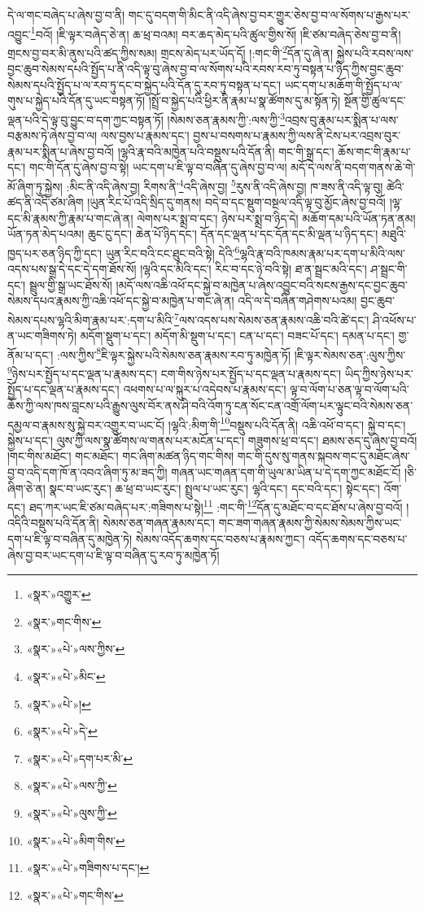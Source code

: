 དེ་ལ་གང་བཞེད་པ་ཞེས་བྱ་བ་ནི། གང་དུ་བདག་གི་མིང་ནི་འདི་ཞེས་བྱ་བར་གྱུར་ཅེས་བྱ་བ་ལ་སོགས་པ་རྒྱས་པར་འབྱུང་\footnote{«སྣར་»འགྱུར་}བའོ། །ཇི་ལྟར་བཞེད་ཅེ་ན། ཆ་ཕྲ་བའམ། བར་ཆད་མེད་པའི་ཚུལ་གྱིས་སོ། །ཇི་ཙམ་བཞེད་ཅེས་བྱ་བ་ནི། གྲངས་བྱ་བར་མི་ནུས་པའི་ཚད་ཀྱིས་སམ། གྲངས་མེད་པར་ཡོད་དོ། །:གང་གི་\footnote{«སྣར་»གང་གིས་}དོན་དུ་ཞེ་ན། སྐྱེས་པའི་རབས་ལས་བྱང་ཆུབ་སེམས་དཔའི་སྤྱོད་པ་ནི་འདི་ལྟ་བུ་ཞེས་བྱ་བ་ལ་སོགས་པའི་རབས་རབ་ཏུ་བསྟན་པ་ཉིད་ཀྱིས་བྱང་ཆུབ་སེམས་དཔའི་སྤྱོད་པ་ལ་རབ་ཏུ་དང་བ་སྐྱེད་པའི་དོན་དུ་རབ་ཏུ་བསྟན་པ་དང་། ཡང་དག་པ་མཆོག་གི་སྤྱོད་པ་ལ་གུས་པ་སྐྱེད་པའི་དོན་དུ་ཡང་བསྟན་ཏོ། །སྤྲོ་བ་སྐྱེད་པའི་ཕྱིར་ནི་རྣམ་པ་སྣ་ཚོགས་དུ་མ་སྟོན་ཏེ། སྔོན་གྱི་ཚུལ་དང་ལྡན་པའི་དེ་ལྟ་བུ་བྱུང་བ་དག་ཀྱང་བསྟན་ཏོ། །སེམས་ཅན་རྣམས་ཀྱི་:ལས་ཀྱི་\footnote{«སྣར་»«པེ་»ལས་ཀྱིས་}འབྲས་བུ་རྣམ་པར་སྨིན་པ་ལས་བརྩམས་ཏེ་ཞེས་བྱ་བ་ལ། ལས་བྱས་པ་རྣམས་དང་། བྱས་པ་བསགས་པ་རྣམས་ཀྱི་ལས་ནི་ངེས་པར་འབྲས་བུར་རྣམ་པར་སྨིན་པ་ཞེས་བྱ་བའོ། །ལྷའི་རྣ་བའི་མཁྱེན་པའི་བསྡུས་པའི་དོན་ནི། གང་གི་སྒྲ་དང་། ཆོས་གང་གི་རྣམ་པ་དང་། གང་གི་དོན་དུ་ཞེས་བྱ་བ་སྟེ། ཡང་དག་པ་ཇི་ལྟ་བ་བཞིན་དུ་ཞེས་བྱ་བ་ལ། མདོ་དེ་ལས་ནི་བདག་གནས་ཆེ་གེ་མོ་ཞིག་ཏུ་སྐྱེས། :མིང་ནི་འདི་ཞེས་བྱ། རིགས་ནི་\footnote{«སྣར་»«པེ་»མིང་}འདི་ཞེས་བྱ། \footnote{«སྣར་»«པེ་»།  }རུས་ནི་འདི་ཞེས་བྱ། ཁ་ཟས་ནི་འདི་ལྟ་བུ། ཚེའི་ཚད་ནི་འདི་ཙམ་ཞིག །ཡུན་རིང་པོ་འདི་སྲིད་དུ་གནས། བདེ་བ་དང་སྡུག་བསྔལ་འདི་ལྟ་བུ་མྱོང་ཞེས་བྱ་བའོ། །ལྷ་དང་མི་རྣམས་ཀྱི་རྣམ་པ་གང་ཞེ་ན། ལེགས་པར་སྨྲ་བ་དང་། ཉེས་པར་སྨྲ་བ་ཉིད་དེ། མཆོག་དམ་པའི་ཡོན་ཏན་ནམ། ཡོན་ཏན་མེད་པའམ། ཆུང་ངུ་དང་། ཆེན་པོ་ཉིད་དང་། དོན་དང་ལྡན་པ་དང་དོན་དང་མི་ལྡན་པ་ཉིད་དང་། མཐུའི་ཁྱད་པར་ཅན་ཉིད་ཀྱི་དང་། ཡུན་རིང་བའི་ངང་ཐུང་བའི་སྟེ། དེའི་\footnote{«སྣར་»«པེ་»དེ་}ལྷའི་རྣ་བའི་ཁམས་རྣམ་པར་དག་པ་མིའི་ལས་འདས་པས་སྒྲ་དེ་དང་དེ་དག་ཐོས་སོ། །ལྷའི་དང་མིའི་དང་། རིང་བ་དང་ཉེ་བའི་སྟེ། ཐ་ན་སྦྲང་མའི་དང་། ཤ་སྦྲང་གི་དང་། སྦྲུལ་གྱི་སྒྲ་ཡང་ཐོས་སོ། །མདོ་ལས་འཆི་འཕོ་དང་སྐྱེ་བ་མཁྱེན་པ་ཞེས་འབྱུང་བའི་སངས་རྒྱས་དང་བྱང་ཆུབ་སེམས་དཔའ་རྣམས་ཀྱི་འཆི་འཕོ་དང་སྐྱེ་བ་མཁྱེན་པ་གང་ཞེ་ན། འདི་ལ་དེ་བཞིན་གཤེགས་པའམ། བྱང་ཆུབ་སེམས་དཔས་ལྷའི་མིག་རྣམ་པར་:དག་པ་མིའི་\footnote{«སྣར་»«པེ་»དག་པར་མི་}ལས་འདས་པས་སེམས་ཅན་རྣམས་འཆི་བའི་ཚེ་དང་། ཤི་འཕོས་པ་ན་ཡང་གཟིགས་ཏེ། མདོག་སྡུག་པ་དང་། མདོག་མི་སྡུག་པ་དང་། ངན་པ་དང་། བཟང་པོ་དང་། དམན་པ་དང་། གྱ་ནོམ་པ་དང་། :ལས་ཀྱིས་\footnote{«སྣར་»«པེ་»ལས་ཀྱི་}ཇི་ལྟར་སྐྱེས་པའི་སེམས་ཅན་རྣམས་རབ་ཏུ་མཁྱེན་ཏོ། །ཇི་ལྟར་སེམས་ཅན་:ལུས་ཀྱིས་\footnote{«སྣར་»«པེ་»ལུས་ཀྱི་}ཉེས་པར་སྤྱོད་པ་དང་ལྡན་པ་རྣམས་དང་། ངག་གིས་ཉེས་པར་སྤྱོད་པ་དང་ལྡན་པ་རྣམས་དང་། ཡིད་ཀྱིས་ཉེས་པར་སྤྱོད་པ་དང་ལྡན་པ་རྣམས་དང་། འཕགས་པ་ལ་སྐུར་པ་འདེབས་པ་རྣམས་དང་། ལྟ་བ་ལོག་པ་ཅན་ལྟ་བ་ལོག་པའི་ཆོས་ཀྱི་ལས་ཁས་བླངས་པའི་རྒྱུས་ལུས་བོར་ནས་ཤི་བའི་འོག་ཏུ་ངན་སོང་ངན་འགྲོ་ལོག་པར་ལྟུང་བའི་སེམས་ཅན་དམྱལ་བ་རྣམས་སུ་སྐྱེ་བར་འགྱུར་བ་ཡང་ངོ། །ལྷའི་:མིག་གི་\footnote{«སྣར་»«པེ་»མིག་གིས་}བསྡུས་པའི་དོན་ནི། འཆི་འཕོ་བ་དང་། སྐྱེ་བ་དང་། སྐྱེས་པ་དང་། ལུས་ཀྱི་ལས་སྣ་ཚོགས་ལ་གནས་པར་མངོན་པ་དང་། གཟུགས་ཕྲ་བ་དང་། ཐམས་ཅད་དུ་ཞེས་བྱ་བའོ། །གང་གིས་མཐོང་། གང་མཐོང་། གང་ཞིག་མཚན་ཉིད་གང་གིས། གང་གི་དུས་སུ་གནས་སྐབས་གང་དུ་མཐོང་ཞེས་བྱ་བ་འདི་དག་ཁོ་ན་འབའ་ཞིག་ཏུ་མ་ཟད་ཀྱི། གཞན་ཡང་གཞན་དག་གི་ཡུལ་མ་ཡིན་པ་དེ་དག་ཀྱང་མཐོང་ངོ། །ཅི་ཞིག་ཅེ་ན། སྣང་བ་ཡང་རུང་། ཆ་ཕྲ་བ་ཡང་རུང་། སྤྲུལ་པ་ཡང་རུང་། ལྷའི་དང་། དང་བའི་དང་། སྟེང་དང་། འོག་དང་། ཐད་ཀར་ཡང་ཇི་ཙམ་བཞེད་པར་:གཟིགས་པ་སྟེ།\footnote{«སྣར་»«པེ་»གཟིགས་པ་དང་།} :གང་གི་\footnote{«སྣར་»«པེ་»གང་གིས་}དོན་དུ་མཐོང་བ་དང་ཐོས་པ་ཞེས་བྱ་བའོ། །འདིའི་བསྡུས་པའི་དོན་ནི། སེམས་ཅན་གཞན་རྣམས་དང་། གང་ཟག་གཞན་རྣམས་ཀྱི་སེམས་སེམས་ཀྱིས་ཡང་དག་པ་ཇི་ལྟ་བ་བཞིན་དུ་མཁྱེན་ཏེ། སེམས་འདོད་ཆགས་དང་བཅས་པ་རྣམས་ཀྱང་། འདོད་ཆགས་དང་བཅས་པ་ཞེས་བྱ་བར་ཡང་དག་པ་ཇི་ལྟ་བ་བཞིན་དུ་རབ་ཏུ་མཁྱེན་ཏོ། 